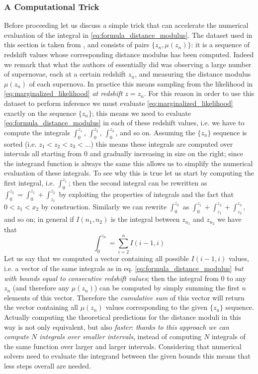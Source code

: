 \subsubsection{A Computational Trick}
Before proceeding let us discuss a simple trick that can accelerate the numerical evaluation of the integral in \eqref{eq:formula_distance_modulus}.
The dataset used in this section is taken from \cite{dark_energy_data}, and consists of pairs $\{z_n, \mu(z_n)\}$: it is a sequence of redshift values whose corresponding distance modulus has been computed. 
Indeed we remark that what the authors of \cite{dark_energy_data} essentially did was observing a large number of supernovae, each at a certain redshift $z_n$, and measuring the distance modulus $\mu(z_n)$ of each supernova. In practice this means sampling from the likelihood in \eqref{eq:marginalized_likelihood} \emph{at redshift $z=z_n$}. For this reason in order to use this dataset to perform inference we must evaluate \eqref{eq:marginalized_likelihood} exactly on the sequence $\{z_n\}$; this means we need to evaluate \eqref{eq:formula_distance_modulus} in each of these redshift values, i.e. we have to compute the integrals $\int_0^{z_1}$, $\int_0^{z_2}$, $\int_0^{z_3}$, and so on. Assuming the $\{z_n\}$ sequence is sorted (i.e. $z_1<z_2<z_3<\dots$) this means these integrals are computed over intervals all starting from 0 and gradually increasing in size on the right; since the integrand function is always the same this allows us to simplify the numerical evaluation of these integrals.
To see why this is true let us start by computing the first integral, i.e. $\int_0^{z_1}$; then the second integral can be rewritten as $\int_0^{z_2} = \int_0^{z_1} + \int_{z_1}^{z_2}$ by exploiting the properties of integrals and the fact that $0<z_1<x_2$ by construction.
Similarly we can rewrite $\int_0^{z_3}$ as $\int_0^{z_1} + \int_{z_1}^{z_2} + \int_{z_2}^{z_3}$, and so on; in general if $I(n_1, n_2)$ is the integral between $z_{n_1}$ and $z_{n_2}$ we have that
\begin{equation*}
    \int_0^{z_n} = \sum_{i=2}^n I(i-1, i)
\end{equation*}
Let us say that we computed a vector containing all possible $I(i-1, i)$ values, i.e. a vector of the same integrals as in eq. \eqref{eq:formula_distance_modulus} \emph{but with bounds equal to consecutive redshift values}; then the integral from $0$ to any $z_n$ (and therefore any $\mu(z_n)$) can be computed by simply summing the first $n$ elements of this vector. Therefore the \emph{cumulative sum} of this vector will return the vector containing all $\mu(z_n)$ values corresponding to the given $\{z_n\}$ sequence.
Actually computing the theoretical predictions for the distance moduli in this way is not only equivalent, but also \emph{faster}: \emph{thanks to this approach we can compute $N$ integrals over smaller intervals}, instead of computing $N$ integrals of the same function over larger and larger intervals. Considering that numerical solvers need to evaluate the integrand between the given bounds this means that less steps overall are needed. 

